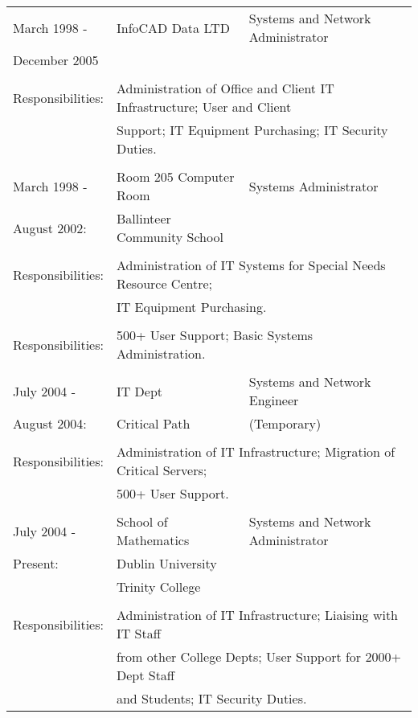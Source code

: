 \documentclass[a4paper, 11pt] {article}
\begin{document}
\begin{tabular}{llll}
March 1998 - 		&	InfoCAD Data LTD	& Systems and Network Administrator	&	\hspace{10mm}	\\
December 2005    	&			&              &            			\\
      				&			&              &            			\\
Responsibilities:	& \multicolumn{3}{l}{Administration of Office and Client IT Infrastructure; User and Client} 	\\
						& \multicolumn{3}{l}{Support; IT Equipment Purchasing; IT Security Duties.} 	\\
      				&              						&  &	\\
March 1998 -		& 	Room 205 Computer Room			&	Systems Administrator	& \hspace{10mm}	\\
August 2002:		&  Ballinteer Community School	&	&	\\
						& 		&	\\
Responsibilities:	& \multicolumn{3}{l}{Administration of IT Systems for Special Needs Resource Centre;} 	\\
						& \multicolumn{3}{l}{IT Equipment Purchasing.} 	\\
						& 											&	&	\\
Responsibilities:	& \multicolumn{3}{l}{500+ User Support; Basic Systems
Administration.} 	\\
						&											&	&	\\
July 2004 -			& IT Dept								&	Systems and Network Engineer	& \hspace{10mm}\\
August 2004:		& Critical Path						& (Temporary)	&	\\
						& 											&	&	\\
Responsibilities:	& \multicolumn{3}{l}{Administration of IT Infrastructure; Migration of Critical Servers;}	\\ 
						& \multicolumn{3}{l}{500+ User Support.} 	\\
						&												&\\
July 2004 -			& 	School of Mathematics	&	Systems and Network Administrator &	\\
Present:				& 	Dublin University			&	&	\\
						& 	Trinity College			&	&	\\
						& 									&	&	\\
Responsibilities:	& \multicolumn{3}{l}{Administration of IT Infrastructure; Liaising with IT Staff}	\\ 
						& \multicolumn{3}{l}{from other College Depts; User Support for 2000+ Dept Staff}	\\
						& \multicolumn{3}{l}{and Students; IT Security Duties.} 	\\
\end{tabular}
\end{document}
